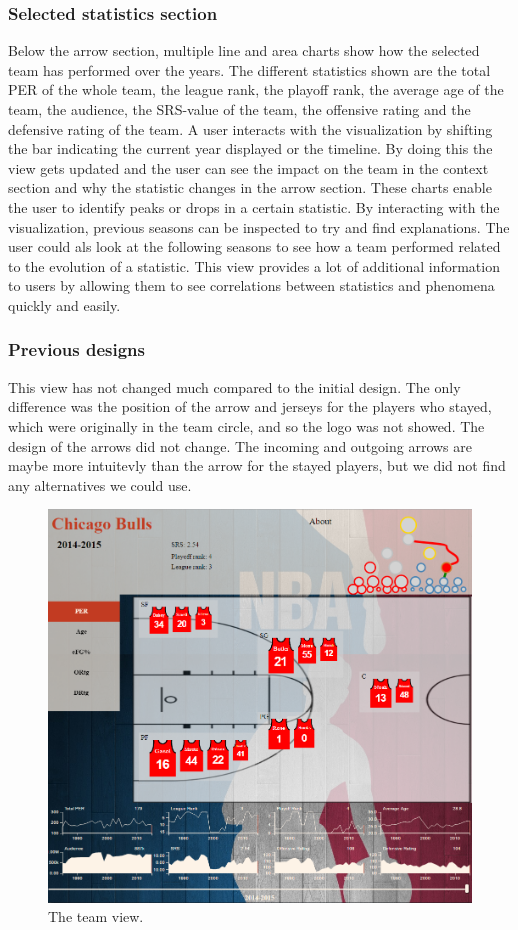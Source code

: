 \documentclass[]{sigchi}
\begin{document}
\subsubsection{Selected statistics section}
Below the arrow section, multiple line and area charts show how the selected 
team has performed over the years. The different statistics shown are the 
total PER of the whole team, the league rank, the playoff rank, the average age 
of the team, the audience, the SRS-value of the team, the offensive rating and 
the defensive rating of the team. A user interacts with the visualization by 
shifting the bar indicating the current year displayed or the timeline. By 
doing this the view gets updated and the user can see the impact on the team 
in the context section and why the statistic changes in the arrow section. 
These charts enable the user to identify peaks or drops in a certain statistic. 
By interacting with the visualization, previous seasons can be inspected to try 
and find explanations. The user could als look at the following seasons to see how a team 
performed related to the evolution of a statistic. This view provides 
a lot of additional information to users by allowing them to see correlations 
between statistics and phenomena quickly and easily.

\subsubsection{Previous designs}
This view has not changed much compared to the initial design. The only difference 
was the position of the arrow and jerseys for the players who stayed, which were 
originally in the team circle, and so the logo was not showed. 
The design of the arrows did not change. The incoming and outgoing 
arrows are maybe more intuitevly than the arrow for the stayed players, but we did 
not find any alternatives we could use.

\begin{figure}
\centering
  \includegraphics[width=1.0\columnwidth]{figures/teamview}
  \caption{The team view.}
  \label{fig:teamview}
\end{figure}
\end{document}
